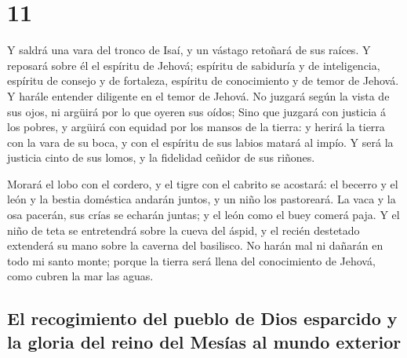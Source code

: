 \hypertarget{section-23-11}{%
\section{11}\label{section-23-11}}

 Y saldrá una vara del tronco de Isaí, y un vástago
retoñará de sus raíces.  Y reposará sobre él el espíritu
de Jehová; espíritu de sabiduría y de inteligencia, espíritu de consejo
y de fortaleza, espíritu de conocimiento y de temor de Jehová.
 Y harále entender diligente en el temor de Jehová. No
juzgará según la vista de sus ojos, ni argüirá por lo que oyeren sus
oídos;  Sino que juzgará con justicia á los pobres, y
argüirá con equidad por los mansos de la tierra: y herirá la tierra con
la vara de su boca, y con el espíritu de sus labios matará al impío.
 Y será la justicia cinto de sus lomos, y la fidelidad
ceñidor de sus riñones.

 Morará el lobo con el cordero, y el tigre con el cabrito
se acostará: el becerro y el león y la bestia doméstica andarán juntos,
y un niño los pastoreará.  La vaca y la osa pacerán, sus
crías se echarán juntas; y el león como el buey comerá paja.
 Y el niño de teta se entretendrá sobre la cueva del
áspid, y el recién destetado extenderá su mano sobre la caverna del
basilisco.  No harán mal ni dañarán en todo mi santo
monte; porque la tierra será llena del conocimiento de Jehová, como
cubren la mar las aguas.

\hypertarget{el-recogimiento-del-pueblo-de-dios-esparcido-y-la-gloria-del-reino-del-mesuxedas-al-mundo-exterior}{%
\subsection{El recogimiento del pueblo de Dios esparcido y la gloria del
reino del Mesías al mundo
exterior}\label{el-recogimiento-del-pueblo-de-dios-esparcido-y-la-gloria-del-reino-del-mesuxedas-al-mundo-exterior}}


